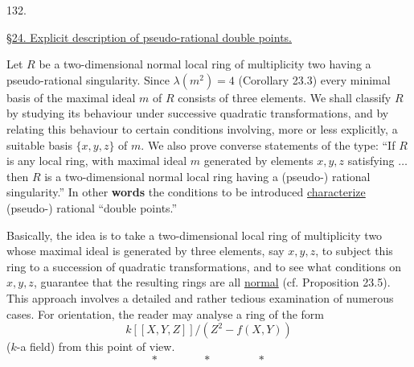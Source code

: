 132.

\uline{\S24. Explicit description of pseudo-rational double points.}

Let $R$ be a two-dimensional normal local ring of multiplicity two having a pseudo-rational singularity. Since $\lambda(m^2)=4$ (Corollary 23.3) every minimal basis of the maximal ideal $m$ of $R$ consists of three elements. We shall classify $R$ by studying its behaviour under successive quadratic transformations, and by relating this behaviour to certain conditions involving, more or less explicitly, a suitable basis $\{x,y,z\}$ of $m$. We also prove converse statements of the type: ``If $R$ is any local ring, with maximal ideal $m$ generated by elements $x,y,z$ satisfying $\ldots$ then $R$ is a two-dimensional normal local ring having a (pseudo-) rational singularity.'' In other \textbf{words} the conditions to be introduced \uline{characterize} (pseudo-) rational ``double points.''

Basically, the idea is to take a two-dimensional local ring of multiplicity two whose maximal ideal is generated by three elements, say $x,y,z$, to subject this ring to a succession of quadratic transformations, and to see what conditions on $x,y,z$, guarantee that the resulting rings are all \uline{normal} (cf. Proposition 23.5). This approach involves a detailed and rather tedious examination of numerous cases. For orientation, the reader may analyse a ring of the form
\[
k[[X,Y,Z]]/(Z^2-f(X,Y))
\]
($k$-a field) from this point of view.
\[
*\qquad\qquad *\qquad\qquad *
\]
